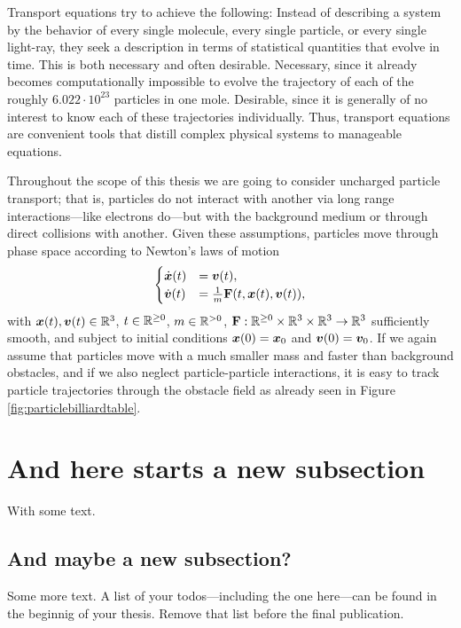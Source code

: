 Transport equations try to achieve the following: Instead of describing a 
system by the behavior of every single molecule, every single particle, or every single light-ray, 
they seek a description in terms of statistical quantities that evolve in time. This is both 
necessary and often desirable. Necessary, since it already becomes computationally 
impossible 
to evolve the trajectory of each of the roughly $6.022\cdot 10^{23}$ particles in one mole.
Desirable, since it is generally of no interest to know each of these trajectories individually.
Thus, transport equations are convenient tools that distill complex physical systems to 
manageable equations.


Throughout the scope of this thesis we are going to consider uncharged particle 
transport; 
that is, particles do not interact with another via long range interactions---like electrons 
do---but with the background medium or through direct collisions with another.
Given these assumptions, particles move through phase space according to Newton's laws of motion
\begin{align}
	\begin{cases}
		\dot{{\bm{x}}}(t) & = {\bm{v}}(t),                          \\
		\dot{{\bm{v}}}(t) & = \frac{1}{m} {\bf{F}}(t,{\bm{x}}(t),{\bm{v}}(t)), \\
	\end{cases}
	\label{eq:NewtonsLaw}
\end{align}
with ${\bm{x}}(t),{\bm{v}}(t) \in \mathbb{R}^3$, $t\in\mathbb{R}^{\geq0}$, $m\in \mathbb{R}^{>0}$, ${\bf{F}}: \mathbb{R}^{\geq0} \times \mathbb{R}^3 \times \mathbb{R}^3 \to \mathbb{R}^3$ sufficiently smooth, and subject to initial conditions ${\bm{x}}(0) = {\bm{x}}_0$ and ${\bm{v}}(0) = {\bm{v}}_0$. If we again assume that particles move with a much smaller mass and faster than background obstacles, and if we also neglect particle-particle interactions, it is easy to track particle trajectories through the obstacle field as already seen in  Figure \ref{fig:particlebilliardtable}.


\section{And here starts a new subsection}
With some text.
\subsection{And maybe a new subsection?}
Some more text.
A list of your todos---including the one here---can be found in the beginnig of your thesis. Remove that list before the final publication.

